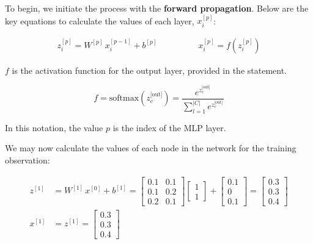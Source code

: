 \documentclass[12pt]{article}
\begin{document}
\begin{enumerate}
To begin, we initiate the process with the \textbf{forward propagation}. Below are the key equations to calculate the values of each
layer, $x^{[p]}_i$:

\begin{align*}
z^{[p]}_i = W^{[p]} \, x^{[p-1]}_i + b^{[p]} & \qquad\qquad
x^{[p]}_i = f\left(z^{[p]}_i\right)
\end{align*}

$f$ is the activation function for the output layer, provided in the statement.

\begin{equation*}
    f = \text{softmax}(z_c^\text{[out]}) = \frac{e^{z_c^\text{[out]}}}{\sum_{l=1}^{|C|} e^{z_c^\text{[out]}}}
\end{equation*}

\vspace{10pt}
In this notation, the value $p$ is the index of the MLP layer.

We may now calculate the values of each node in the network for the training observation:

\vspace{10pt}
\begin{equation*}
    \begin{aligned}
        z^{[1]} &= W^{[1]} \, x^{[0]} + b^{[1]} = \begin{bmatrix}
            0.1 & 0.1 \\
            0.1 & 0.2 \\
            0.2 & 0.1
        \end{bmatrix} \begin{bmatrix}
            1 \\
            1
        \end{bmatrix} + \begin{bmatrix}
            0.1 \\
            0 \\
            0.1
        \end{bmatrix} = \begin{bmatrix}
            0.3 \\
            0.3 \\
            0.4
        \end{bmatrix} \\
        x^{[1]} &= z^{[1]} = \begin{bmatrix}
            0.3 \\
            0.3 \\
            0.4
        \end{bmatrix}
    \end{aligned}
\end{equation*}


\end{enumerate}
\end{document}
